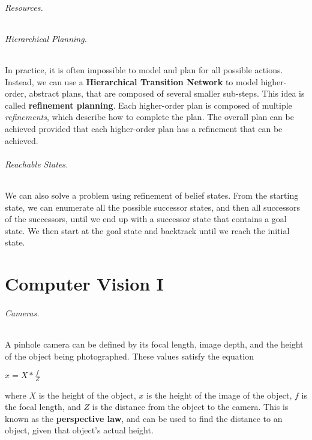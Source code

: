 \documentclass[10pt,a4paper]{article}
\begin{document}
\paragraph{Resources.}

\paragraph{Hierarchical Planning.} In practice, it is often impossible to model and plan for all possible actions. Instead, we can use a \textbf{Hierarchical Transition Network} to model higher-order, abstract plans, that are composed of several smaller sub-steps. This idea is called \textbf{refinement planning}. Each higher-order plan is composed of multiple \textit{refinements}, which describe how to complete the plan. The overall plan can be achieved provided that each higher-order plan has a refinement that can be achieved.

\paragraph{Reachable States.} We can also solve a problem using refinement of belief states. From the starting state, we can enumerate all the possible successor states, and then all successors of the successors, until we end up with a successor state that contains a goal state. We then start at the goal state and backtrack until we reach the initial state.


\part{Computer Vision I}

\paragraph{Cameras.} A pinhole camera can be defined by its focal length, image depth, and the height of the object being photographed. These values satisfy the equation
\begin{center}
$\displaystyle x = X * \frac{f}{Z}$
\end{center}
where $X$ is the height of the object, $x$ is the height of the image of the object, $f$ is the focal length, and $Z$ is the distance from the object to the camera. This is known as the \textbf{perspective law}, and can be used to find the distance to an object, given that object's actual height.
\end{document}
